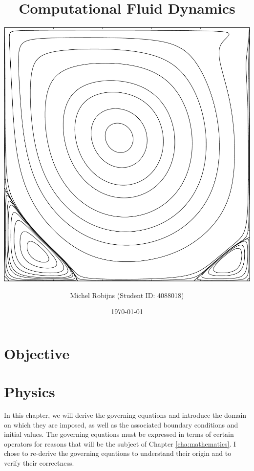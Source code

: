 \documentclass[a4paper, 11pt, toc=bibliography, parskip=half]{scrreprt}
\begin{document}
\titlehead{Delft University of Technology}
\subject{AE4134 - CFD I}
\title{Computational Fluid Dynamics}
\subtitle{\vspace{2cm}\centering\includegraphics[width=0.8\linewidth]{Images/streamFunction.pdf}\vspace{1.5cm}}
\author{Michel Robijns (Student ID: 4088018)}
\date{\today}

\maketitle

\tableofcontents

\chapter{Objective}



\chapter{Physics}
\label{cha:physics}

In this chapter, we will derive the governing equations and introduce the domain on which they are imposed, as well as the associated boundary conditions and initial values. The governing equations must be expressed in terms of certain operators for reasons that will be the subject of Chapter \ref{cha:mathematics}. I chose to re-derive the governing equations to understand their origin and to verify their correctness.
\end{document}

